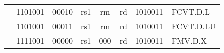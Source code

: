 \begin{table}[p]
\begin{small}
\begin{center}
\begin{tabular}{p{0in}p{0.4in}p{0.05in}p{0.05in}p{0.05in}p{0.05in}p{0.4in}p{0.6in}p{0.4in}p{0.6in}p{0.7in}l}
&
\multicolumn{4}{|c|}{1101001} &
\multicolumn{2}{c|}{00010} &
\multicolumn{1}{c|}{rs1} &
\multicolumn{1}{c|}{rm} &
\multicolumn{1}{c|}{rd} &
\multicolumn{1}{c|}{1010011} & FCVT.D.L \\
\cline{2-11}


&
\multicolumn{4}{|c|}{1101001} &
\multicolumn{2}{c|}{00011} &
\multicolumn{1}{c|}{rs1} &
\multicolumn{1}{c|}{rm} &
\multicolumn{1}{c|}{rd} &
\multicolumn{1}{c|}{1010011} & FCVT.D.LU \\
\cline{2-11}


&
\multicolumn{4}{|c|}{1111001} &
\multicolumn{2}{c|}{00000} &
\multicolumn{1}{c|}{rs1} &
\multicolumn{1}{c|}{000} &
\multicolumn{1}{c|}{rd} &
\multicolumn{1}{c|}{1010011} & FMV.D.X \\
\cline{2-11}


\end{tabular}
\end{center}
\end{small}

\end{table}


\newpage

